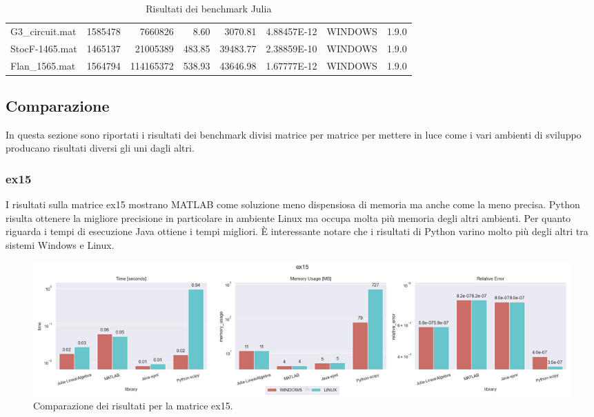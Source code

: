 \documentclass[a4paper, 12pt]{article}
\begin{document}
\begin{table}[h]
{\begin{tabular}{@{}lrrrrrcc@{}}
                    G3\_circuit.mat     & 1585478 & 7660826   & 8.60   & 3070.81  & 4.88457E-12 & WINDOWS & 1.9.0 \\
                    StocF-1465.mat      & 1465137 & 21005389  & 483.85 & 39483.77 & 2.38859E-10 & WINDOWS & 1.9.0 \\
                    Flan\_1565.mat      & 1564794 & 114165372 & 538.93 & 43646.98 & 1.67777E-12 & WINDOWS & 1.9.0 \\ \bottomrule
                    \end{tabular}%
                    }
                    \caption{Risultati dei benchmark Julia}
                    \label{tab:result_julia}
                \end{table}
            
        \subsection{Comparazione}
            In questa sezione sono riportati i risultati dei benchmark divisi
            matrice per matrice per mettere in luce come i vari ambienti di 
            sviluppo producano risultati diversi gli uni dagli altri.
            \subsubsection{ex15}
                I risultati sulla matrice ex15 mostrano MATLAB come soluzione 
                meno dispensiosa di memoria ma anche come la meno precisa.
                Python risulta ottenere la migliore precisione in particolare 
                in ambiente Linux ma occupa molta più memoria degli altri 
                ambienti. Per quanto riguarda i tempi di esecuzione Java ottiene
                i tempi migliori. \`E interessante notare che i risultati di
                Python varino molto più degli altri tra sistemi Windows e Linux.
                \begin{figure}[h]
                    \includegraphics[width=\textwidth]{ex15}
                    \caption{Comparazione dei risultati per la matrice ex15.}
                    \label{fig:ex15}
                \end{figure}
\end{document}
